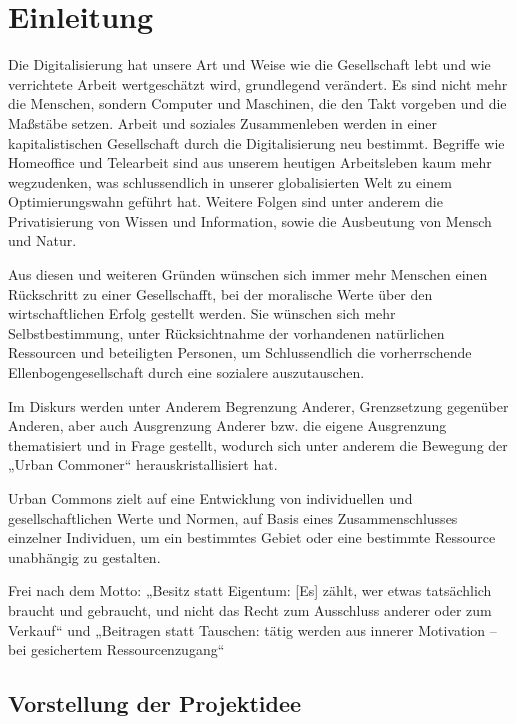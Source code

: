 \chapter{Einleitung} \label{Einleitung}

Die Digitalisierung hat unsere Art und Weise wie die Gesellschaft lebt und wie verrichtete Arbeit wertgeschätzt wird, grundlegend verändert. Es sind nicht mehr die Menschen, sondern Computer und Maschinen, die den Takt vorgeben und die Maßstäbe setzen. Arbeit und soziales Zusammenleben werden in einer kapitalistischen Gesellschaft durch die Digitalisierung neu bestimmt. Begriffe wie Homeoffice und Telearbeit sind aus unserem heutigen Arbeitsleben kaum mehr wegzudenken, was schlussendlich in unserer globalisierten Welt zu einem Optimierungswahn geführt hat. Weitere Folgen sind unter anderem die Privatisierung von Wissen und Information, sowie die Ausbeutung von Mensch und Natur.

Aus diesen und weiteren Gründen wünschen sich immer mehr Menschen einen Rückschritt zu einer Gesellschafft, bei der moralische Werte über den wirtschaftlichen Erfolg gestellt werden.
Sie wünschen sich mehr Selbstbestimmung, unter Rücksichtnahme der vorhandenen natürlichen Ressourcen und beteiligten Personen, um Schlussendlich die vorherrschende Ellenbogengesellschaft durch eine sozialere auszutauschen.

Im Diskurs werden unter Anderem Begrenzung Anderer, Grenzsetzung gegenüber Anderen, aber auch Ausgrenzung Anderer bzw. die eigene Ausgrenzung thematisiert und in Frage gestellt, wodurch sich unter anderem die Bewegung der „Urban Commoner“ herauskristallisiert hat.

Urban Commons zielt auf eine Entwicklung von individuellen und gesellschaftlichen Werte und Normen, auf Basis eines Zusammenschlusses einzelner Individuen, um ein bestimmtes Gebiet oder eine bestimmte Ressource unabhängig zu gestalten.

Frei nach dem Motto: „Besitz statt Eigentum: [Es] zählt, wer etwas tatsächlich braucht und gebraucht, und nicht das Recht zum Ausschluss anderer oder zum Verkauf“ und  „Beitragen statt Tauschen: tätig werden aus innerer Motivation – bei gesichertem Ressourcenzugang“\cite{commonzukunft}

\section{Vorstellung der Projektidee} \label{Vorstellung der Projektidee}

